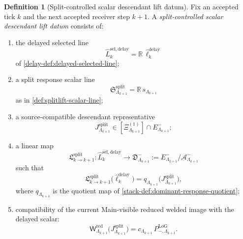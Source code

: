 \documentclass[11pt]{article}
\theoremstyle{definition}
\newtheorem{definition}{Definition}[section]
\theoremstyle{plain}
\theoremstyle{remark}
\newcommand{\1}{\mathbf 1}
\begin{document}
\begin{definition}[Split-controlled scalar descendant lift datum]
\label{def:splitlift-scalar-datum}
Fix an accepted tick \(k\) and the next accepted receiver step \(k+1\).
A \emph{split-controlled scalar descendant lift datum} consists of:
\begin{enumerate}[leftmargin=2em,label=(\alph*)]
\item the delayed selected line
  \[
  \widehat L^{\mathrm{sel,delay}}_k
  =
  \mathbb R\,\widehat\ell^{\mathrm{delay}}_k
  \]
  of \cref{delay-def:delayed-selected-line};
\item a split response scalar line
  \[
  \mathfrak S^{\mathrm{split}}_{\Lambda_{k+1}}
  =
  \mathbb R\,s_{\Lambda_{k+1}}
  \]
  as in \cref{def:splitlift-scalar-line};
\item a source-compatible descendant representative
  \[
  J^{\mathrm{split}}_{\Lambda_{k+1}}
  \in
  [\Xi^{(1)}_{\Lambda_{k+1}}]\cap E^-_{\Lambda_{k+1}};
  \]
\item a linear map
  \[
  \mathfrak L^{\mathrm{split}}_{k\to k+1}:
  \widehat L^{\mathrm{sel,delay}}_k
  \longrightarrow
  \mathfrak D^-_{\Lambda_{k+1}}
  :=
  E^-_{\Lambda_{k+1}}/\mathcal A^-_{\Lambda_{k+1}}
  \]
  such that
  \[
  \mathfrak L^{\mathrm{split}}_{k\to k+1}
  \bigl(\widehat\ell^{\mathrm{delay}}_k\bigr)
  =
  q_{\Lambda_{k+1}}\!\bigl(J^{\mathrm{split}}_{\Lambda_{k+1}}\bigr),
  \]
  where \(q_{\Lambda_{k+1}}\) is the quotient map of
  \cref{stack-def:dominant-response-quotient};
\item compatibility of the current Main-visible reduced welded image with the delayed scalar:
  \[
  \mathsf W^{\mathrm{red}}_{\Lambda_{k+1}}
  \!\bigl(J^{\mathrm{split}}_{\Lambda_{k+1}}\bigr)
  =
  c_{\Lambda_{k+1}}\,
  P^{\mathrm{LoG}}_{-,\Lambda_{k+1}}.
  \]
\end{enumerate}
\end{definition}
\end{document}
